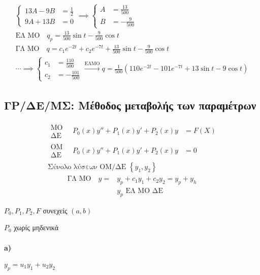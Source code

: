 \documentclass[11pt,a4paper,titlepage,final]{article}
\begin{document}
\begin{exercise*}{5.36}
\begin{gather*}
		\begin{cases}
		13A-9B&=\frac{1}{2}\\
		9A+13B&=0
		\end{cases} \implies \begin{cases}
		A &= \frac{13}{500} \\
		B &= -\frac{9}{500}
		\end{cases}
		\\
		\text{ΕΛ ΜΟ} \quad q_p = \frac{13}{500}\sin t -\frac{9}{500}\cos t\\
		\text{ΓΛ ΜΟ} \quad q = c_1e^{-2t}+c_2e^{-7t}+\frac{13}{500}\sin t - \frac{9}{500}\cos t\\
		\cdots \implies \begin{cases}
		c_1 &= \frac{110}{500} \\
		c_2 &= -\frac{101}{500}
		\end{cases} \xrightarrow{\text{ΕΛΜΟ}} q = \frac{1}{500} (110e^{-2t}-101e^{-7t}+13\sin t-9\cos t)
	\end{gather*}
\end{exercise*}

\subsection{ΓΡ/ΔΕ/ΜΣ: Μέθοδος μεταβολής των παραμέτρων}
\begin{align*}
\begin{matrix}
\text{ΜΟ}\\\text{ΔΕ}\end{matrix}\quad P_0(x)y'' + P_1(x)y'+P_2(x)y &= F(X) \\
\begin{matrix}
\text{ΟΜ}\\\text{ΔΕ}\end{matrix}\quad P_0(x)y'' + P_1(x)y'+P_2(x)y &=0 \\
\text{Σύνολο λύσεων ΟΜ/ΔΕ } \left\lbrace y_1,y_2 \right\rbrace &
\end{align*}
\begin{align*}
\text{ΓΛ ΜΟ}\quad y = & y_p + c_1y_1+c_2y_2=y_p+y_h\\
& y_p \text{ ΕΛ ΜΟ ΔΕ}
\end{align*}

\(P_0,P_1,P_2,F\) συνεχείς \((a,b)\)

\(P_0 \) χωρίς μηδενικά

\paragraph{\textlatin{a})}
\(
y_p = u_1y_1+u_2y_2
\)
\end{document}
